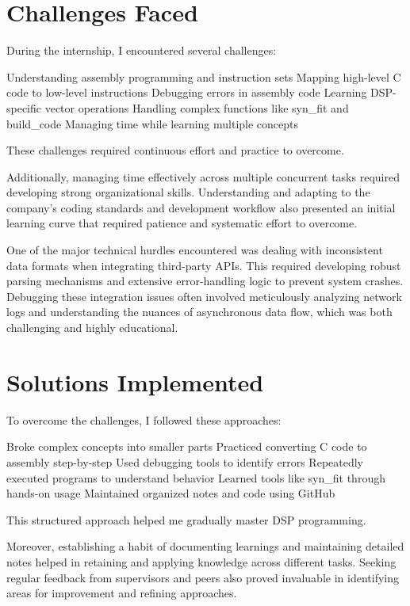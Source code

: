 \documentclass[12pt,a4paper]{report}
\begin{document}
\section{Challenges Faced}

During the internship, I encountered several challenges:


Understanding assembly programming and instruction sets Mapping high-level C code to low-level instructions Debugging errors in assembly code Learning DSP-specific vector operations Handling complex functions like syn\_fit and build\_code Managing time while learning multiple concepts


These challenges required continuous effort and practice to overcome.


Additionally, managing time effectively across multiple concurrent tasks required developing strong organizational skills. Understanding and adapting to the company's coding standards and development workflow also presented an initial learning curve that required patience and systematic effort to overcome.


One of the major technical hurdles encountered was dealing with inconsistent data formats when integrating third-party APIs. This required developing robust parsing mechanisms and extensive error-handling logic to prevent system crashes. Debugging these integration issues often involved meticulously analyzing network logs and understanding the nuances of asynchronous data flow, which was both challenging and highly educational.


\section{Solutions Implemented}

To overcome the challenges, I followed these approaches:


Broke complex concepts into smaller parts Practiced converting C code to assembly step-by-step Used debugging tools to identify errors Repeatedly executed programs to understand behavior Learned tools like syn\_fit through hands-on usage Maintained organized notes and code using GitHub


This structured approach helped me gradually master DSP programming.


Moreover, establishing a habit of documenting learnings and maintaining detailed notes helped in retaining and applying knowledge across different tasks. Seeking regular feedback from supervisors and peers also proved invaluable in identifying areas for improvement and refining approaches.
\end{document}
